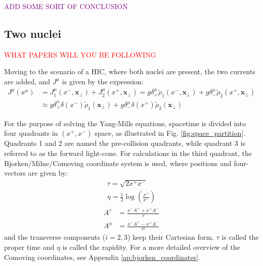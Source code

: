 \textcolor{purple}{ADD SOME SORT OF CONCLUSION}

\subsection{Two nuclei}

\textcolor{red}{WHAT PAPERS WILL YOU BE FOLLOWING} \cite{Albacete:2018bbv} \cite{Guerrero-Rodriguez:2021ask}


Moving to the scenario of a HIC, where both nuclei are present, the two currents are added, and $J^\mu$ is given by the expression:
\begin{equation}
	\begin{split}
		J^\mu(x^\mu) & = J_1^\mu(x^-,\mathbf{x}_\perp) + J_2^\mu(x^+, \mathbf{x}_\perp) = g \delta^{\mu}_+ \tilde{\rho}_1(x^-,\mathbf{x}_\perp) + g \delta^{\mu}_- \tilde{\rho}_2(x^+,\mathbf{x}_\perp) \\
		& \approx g \delta^{\mu}_+ \delta(x^-) \tilde{\rho}_1(\mathbf{x}_\perp) + g \delta^{\mu}_- \delta(x^+) \tilde{\rho}_2(\mathbf{x}_\perp)
	\end{split}
\end{equation}

For the purpose of solving the Yang-Mills equations, spacetime is divided into four quadrants in $(x^+,x^-)$ space,  as illustrated in Fig. \ref{fig:space_partition}. Quadrants 1 and 2 are named the pre-collision quadrants, while quadrant 3 is referred to as the forward light-cone. For calculations in the third quadrant, the Bjorken/Milne/Comoving coordinate system is used, where positions and four-vectors are given by:
\begin{subequations}
	\begin{gather}
		\tau = \sqrt{2x^+x^-} \\
		\eta = \frac{1}{2} \log \left( \frac{x^+}{x^-} \right)
	\end{gather}
\end{subequations}
\begin{subequations}
	\begin{align}
		A^\tau & = \frac{x^- A^+ + x^+ A^-}{\tau} \\
		A^\eta & = \frac{x^- A^+ - x^+ A^-}{\tau^2} \label{eq:milne_Aeta}
	\end{align}
\end{subequations}
and the transverse components ($i=2,3$) keep their Cartesian form. $\tau$ is called the proper time and $\eta$ is called the rapidity. For a more detailed overview of the Comoving coordinates, see Appendix \ref{ap:bjorken_coordinates}.

